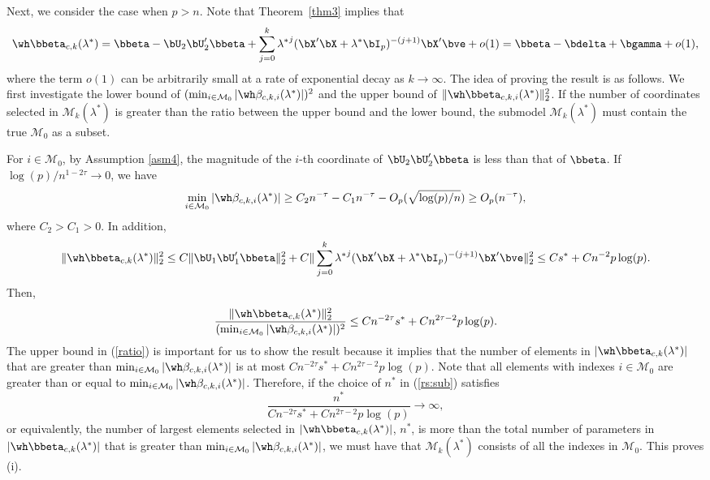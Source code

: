 {{Next, we consider the case when $p>n$. Note that Theorem~\ref{thm3} implies that
\begin{equation}\label{betk:rp}
    \wh\bbeta_{c,k}(\lambda^*)=\bbeta-\bU_2\bU_2'\bbeta+\sum_{j=0}^k{\lambda^*}^j(\bX'\bX+\lambda^*\bI_p)^{-(j+1)}\bX'\bve+o(1)=\bbeta-\bdelta+\bgamma+o(1),
\end{equation}
where the term $o(1)$ can be arbitrarily small at a rate of exponential decay as $k\rightarrow\infty$.
The idea of proving the result is as follows. We first investigate the lower bound of $(\min_{i\in\mathcal{M}_0}|\wh\beta_{c,k,i}(\lambda^*)|)^2$ and the upper bound of $\|\wh\bbeta_{c,k,i}(\lambda^*)\|_2^2$. If the number of coordinates selected in $\mathcal{M}_k(\lambda^*)$ is greater than 
the ratio between the upper bound and the lower bound, the submodel $\mathcal{M}_k(\lambda^*)$ must contain the true $\mathcal{M}_0$ as a subset.

For $i\in\mathcal{M}_0$, by Assumption \ref{asm4}, the magnitude of the $i$-th coordinate of $\bU_2\bU_2'\bbeta$ is less than that of $\bbeta$. If $\log(p)/n^{1-2\tau}\rightarrow 0$, we have 
\[\min_{i\in \mathcal{M}_0}|\wh\beta_{c,k,i}(\lambda^*)|\geq C_2n^{-\tau}-C_1n^{-\tau}-O_p(\sqrt{\log(p)/n})\geq O_p(n^{-\tau}),\]
where $C_2>C_1>0$. In addition,
\[\|\wh\bbeta_{c,k}(\lambda^*)\|_2^2\leq C\|\bU_1\bU_1'\bbeta\|_2^2+C\|\sum_{j=0}^k{\lambda^*}^j(\bX'\bX+\lambda^*\bI_p)^{-(j+1)}\bX'\bve\|_2^2\leq Cs^*+Cn^{-2}p\log(p).\]
Then,
\begin{equation}\label{ratio}
    \frac{\|\wh\bbeta_{c,k}(\lambda^*)\|_2^2}{(\min_{i\in \mathcal{M}_0}|\wh\beta_{c,k,i}(\lambda^*)|)^2}\leq Cn^{-2\tau}s^*+Cn^{2\tau-2}p\log(p).
\end{equation}
The upper bound in (\ref{ratio}) is important for us to show the result because it implies that the number of elements in $|\wh\bbeta_{c,k}(\lambda^*)|$ that are greater than $\min_{i\in \mathcal{M}_0}|\wh\beta_{c,k,i}(\lambda^*)|$ is at most $Cn^{-2\tau}s^*+Cn^{2\tau-2}p\log(p)$. Note that all elements with indexes $i\in \mathcal{M}_0$ are greater than or equal to  $\min_{i\in \mathcal{M}_0}|\wh\beta_{c,k,i}(\lambda^*)|$. Therefore, if the choice of  $n^*$ in (\ref{rs:sub}) satisfies 
\[\frac{n^*}{Cn^{-2\tau}s^*+Cn^{2\tau-2}p\log(p)}\rightarrow\infty,\]
or equivalently,  the number of largest elements selected in $|\wh\bbeta_{c,k}(\lambda^*)|$, $n^*$, is more than the total number of parameters in $|\wh\bbeta_{c,k}(\lambda^*)|$ that is greater than $\min_{i\in \mathcal{M}_0}|\wh\beta_{c,k,i}(\lambda^*)|$,
we must have that $\mathcal{M}_k(\lambda^*)$ consists of all the indexes in $\mathcal{M}_0$. This proves (i).\\

}}
